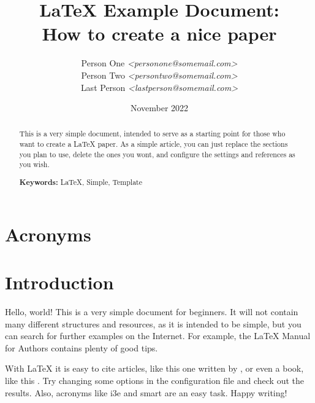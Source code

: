 \documentclass[a4paper,12pt]{article}
\title{
    LaTeX Example Document: \\
    \large{How to create a nice paper} \\
}
\author{
     \small{Person One \textit{<personone@somemail.com>}} \\
     \small{Person Two \textit{<persontwo@somemail.com>}} \\
     \small{Last Person \textit{<lastperson@somemail.com>}} \\
}
\date{November 2022}
\begin{document}
\maketitle

\begin{abstract}
    This is a very simple document, intended to serve as a starting
    point for those who want to create a LaTeX paper. As a simple article,
    you can just replace the sections you plan to use, delete the
    ones you wont, and configure the settings and references as
    you wish.

    \vspace{1em}
    \noindent\textbf{Keywords:} LaTeX, Simple, Template
\end{abstract}

\section*{Acronyms}
\begin{acronym}[ICANN]
\end{acronym}

\section{Introduction}
Hello, world! This is a very simple document for beginners. It will not
contain many different structures and resources, as it is intended
to be simple, but you can search for further examples on the Internet. For example,
the LaTeX Manual for Authors \cite{LaTeX2020} contains plenty of good tips.

With LaTeX it is easy to cite articles, like this one written by \textcite{SomeAuthor2022},
or even a book, like this \cite{Genius1801}. Try changing some options in the configuration
file and check out the results. Also, acronyms like \ac{i3e} and \ac{smart} are an easy task.
Happy writing!

\newpage
\printbibliography[heading=bibnumbered,title=References]
\end{document}

